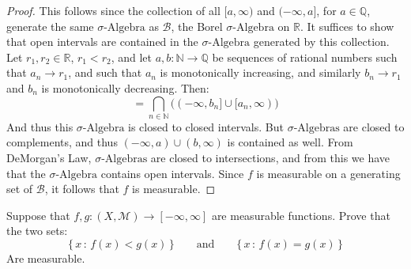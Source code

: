 \documentclass[crop=false,class=article]{standalone}                           %
\begin{document}
    \begin{proof}
        This follows since the collection of all $[a,\infty)$ and
        $(\minus\infty,a]$, for $a\in\mathbb{Q}$, generate the same
        $\sigma\textrm{-Algebra}$ as $\mathcal{B}$, the Borel
        $\sigma\textrm{-Algebra}$ on $\mathbb{R}$. It suffices to show that open
        intervals are contained in the $\sigma\textrm{-Algebra}$ generated by
        this collection. Let $r_{1},r_{2}\in\mathbb{R}$, $r_{1}<r_{2}$, and let
        $a,b:\mathbb{N}\rightarrow\mathbb{Q}$ be sequences of rational numbers
        such that $a_{n}\rightarrow{r}_{1}$, and such that $a_{n}$ is
        monotonically increasing, and similarly $b_{n}\rightarrow{r}_{1}$ and
        $b_{n}$ is monotonically decreasing. Then:
        \begin{equation}
            [r_{1},r_{2}]=\bigcap_{n\in\mathbb{N}}
                \Big((\minus\infty,b_{n}]\cup[a_{n},\infty)\Big)
        \end{equation}
        And thus this $\sigma\textrm{-Algebra}$ is closed to closed intervals.
        But $\sigma\textrm{-Algebras}$ are closed to complements, and thus
        $(\minus{\infty},a)\cup(b,\infty)$ is contained as well. From DeMorgan's
        Law, $\sigma\textrm{-Algebras}$ are closed to intersections, and from
        this we have that the $\sigma\textrm{-Algebra}$ contains open intervals.
        Since $f$ is measurable on a generating set of $\mathcal{B}$, it follows
        that $f$ is measurable.
    \end{proof}
    \begin{problem}
        Suppose that $f,g:(X,\mathcal{M})\rightarrow[\minus\infty,\infty]$
        are measurable functions. Prove that the two sets:
        \begin{equation}
            \{\,x\,:\,f(x)<g(x)\,\}
            \quad\quad\textrm{and}\quad\quad
            \{\,x\,:\,f(x)=g(x)\,\}
        \end{equation}
        Are measurable.
    \end{problem}
\end{document}
